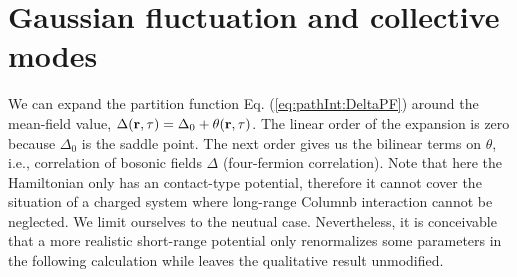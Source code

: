 \section{Gaussian fluctuation and collective modes}\label{sec:collective1}
We can expand the partition function Eq. (\ref{eq:pathInt:DeltaPF}) around the mean-field value, $\Delta(\mathbf{r},\tau)=\Delta_{0}+\theta(\mathbf{r},\tau)$. The linear order of the  expansion is zero because $\Delta_{0}$ is the saddle point.  The next order gives us the bilinear terms on $\theta$, i.e., correlation of bosonic fields $\Delta$ (four-fermion correlation).  Note that here the Hamiltonian only has an contact-type potential, therefore it cannot cover the situation of a charged system where long-range Columnb interaction cannot be neglected.  We limit ourselves to the neutual case.  Nevertheless, it is conceivable that a more realistic short-range potential only renormalizes some parameters in the following calculation while leaves the qualitative result unmodified.  

